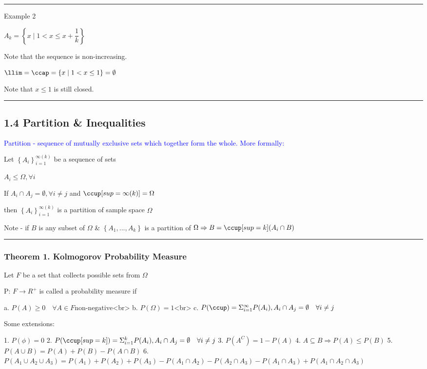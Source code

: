 \documentclass[12pt]{article}
\newcommand{\ddef}[1]{\textcolor{blue}{#1}}
\newcommand{\braces}[1]{\left\{#1\right\}}
\newcommand{\divider}[0]{\rule{\textwidth}{0.1pt}}
\begin{document}
\divider

Example 2

\(A_k = \braces{x \mid 1 < x \le x + \dfrac{1}{k}}\)

Note that the sequence is non-increasing.

\(\llim = \ccap = \braces{x \mid 1 < x \le 1} = \emptyset\)

Note that \(x \le 1\) is still closed.

\divider

\subsection{1.4 Partition \& Inequalities}

\ddef{Partition - sequence of mutually exclusive sets which together form the whole. More formally:}

Let \(\braces{A_i}_{i = 1}^{\infty (k)}\) be a sequence of sets

\(A_i \le \Omega, \forall i\)


If \(A_i \cap A_j = \emptyset, \forall i \ne j\) and \(\ccup[sup=\infty (k)] = \Omega\)

then \(\braces{A_i}_{i=1}^{\infty (k)}\) is a partition of sample space \(\Omega\)

Note - if \(B\) is any subset of \(\Omega\) \& \(\braces{A_1, ..., A_k}\) is a partition of \(\Omega \Rightarrow B = \ccup[sup=k] (A_i \cap B)\)

\divider

\subsubsection{Theorem 1. Kolmogorov Probability Measure}

Let \(F\) be a set that collects possible sets from \(\Omega\)

P: \(F \rightarrow R^+\) is called a probability measure if

a. \(P(A) \ge 0 \quad \forall A \in F \text{non-negative}\)<br>
b. \(P(\Omega) = 1\)<br>
c. \(P(\ccup) = \Sigma_{i=1}^{\infty} P(A_i), A_i \cap A_j = \emptyset \quad \forall i \ne j\)

Some extensions:

1. \(P(\phi) = 0\)
2. \(P(\ccup[sup=k]) = \Sigma_{i=1}^{k} P(A_i), A_i \cap A_j = \emptyset \quad \forall i \ne j\)
3. \(P(A^C) = 1 - P(A)\)
4. \(A \subseteq B \Rightarrow P(A) \le P(B)\)
5. \(P(A \cup B) = P(A) + P(B) - P(A \cap B)\)
6. \(P(A_1 \cup A_2 \cup A_3) = P(A_1) + P(A_2) + P(A_3) - P(A_1 \cap A_2) - P(A_2 \cap A_3) - P(A_1 \cap A_3) + P(A_1 \cap A_2 \cap A_3)\)
\end{document}
